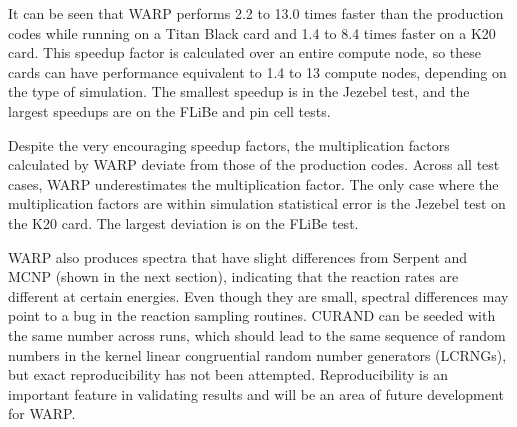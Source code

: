 \documentclass[preprint,12pt]{elsarticle}
\begin{document}
It can be seen that WARP performs 2.2 to 13.0 times faster than the production codes while running on a Titan Black card and 1.4 to 8.4 times faster on a K20 card.  This speedup factor is calculated over an entire compute node, so these cards can have performance equivalent to 1.4 to 13 compute nodes, depending on the type of simulation.   The smallest speedup is in the Jezebel test, and the largest speedups are on the FLiBe and pin cell tests.

Despite the very encouraging speedup factors, the multiplication factors calculated by WARP deviate from those of the production codes.  Across all test cases, WARP underestimates the multiplication factor.  The only case where the multiplication factors are within simulation statistical error is the Jezebel test on the K20 card.  The largest deviation is on the FLiBe test.  

WARP also produces spectra that have slight differences from Serpent and MCNP (shown in the next section), indicating that the reaction rates are different at certain energies.  Even though they are small, spectral differences may point to a bug in the reaction sampling routines.  CURAND can be seeded with the same number across runs, which should lead to the same sequence of random numbers in the kernel linear congruential random number generators (LCRNGs), but exact reproducibility has not been attempted.  Reproducibility is an important feature in validating results and will be an area of future development for WARP.
\end{document}
